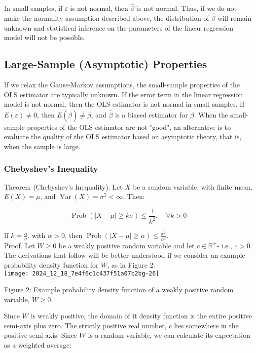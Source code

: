 In small samples, if $\varepsilon$ is not normal, then $\widehat{\beta}$ is not normal. Thus, if we do not make the normality assumption described above, the distribution of $\widehat{\beta}$ will remain unknown and statistical inference on the parameters of the linear regression model will not be possible.

\subsection{Large-Sample (Asymptotic) Properties}
If we relax the Gauss-Markov assumptions, the small-sample properties of the OLS estimator are typically unknown. If the error term in the linear regression model is not normal, then the OLS estimator is not normal in small samples. If $E(\varepsilon) \neq 0$, then $E(\widehat{\beta}) \neq \beta$, and $\widehat{\beta}$ is a biased estimator for $\beta$. When the small-sample properties of the OLS estimator are not "good", an alternative is to evaluate the quality of the OLS estimator based on asymptotic theory, that is, when the sample is large.

\subsubsection{Chebyshev's Inequality}
Theorem (Chebyshev's Inequality). Let $X$ be a random variable, with finite mean, $E(X)=\mu$, and $\operatorname{Var}(X)=\sigma^{2}<\infty$. Then:

$$
\operatorname{Prob}(|X-\mu| \geq k \sigma) \leq \frac{1}{k^{2}}, \quad \forall k>0
$$

If $k=\frac{\alpha}{\sigma}$, with $\alpha>0$, then $\operatorname{Prob}(|X-\mu| \geq \alpha) \leq \frac{\sigma^{2}}{\alpha^{2}}$.\\
Proof. Let $W \geq 0$ be a weakly positive random variable and let $c \in \mathbb{R}^{+}$- i.e., $c>0$. The derivations that follow will be better understood if we consider an example probability density function for $W$, as in Figure 2.\\
\texttt{[image: 2024\_12\_18\_7e4f6c1c437f51a07b2bg-26]}

Figure 2: Example probability density function of a weakly positive random variable, $W \geq 0$.

Since $W$ is weakly positive, the domain of it density function is the entire positive semi-axis plus zero. The strictly positive real number, $c$ lies somewhere in the positive semi-axis. Since $W$ is a random variable, we can calculate its expectation as a weighted average:

